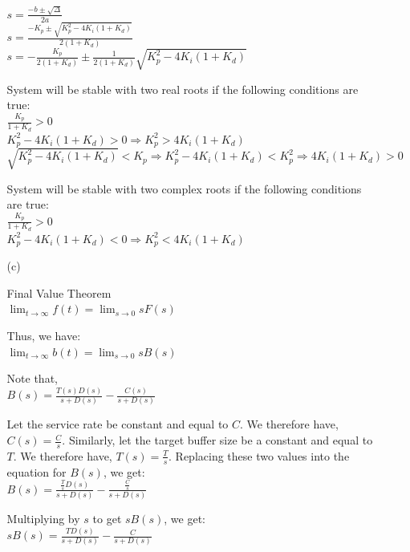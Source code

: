 \documentclass{article}
\begin{document}
\begin{enumerate}
\begin{itemize}
\noindent $s = {\frac{-b \pm \sqrt{\Delta}}{2a}}$\\

\noindent $s = {\frac{-K_p \pm \sqrt{K_p^2 - 4K_i(1+K_d)}}{2(1+K_d)}}$\\

\noindent $s = -{\frac{K_p}{2(1+K_d)}} \pm {\frac{1}{2(1+K_d)}}
\sqrt{K_p^2 - 4K_i(1+K_d)}$ \bigbreak

\noindent System will be stable with two real roots if the
following conditions are true:\\
\noindent ${\frac{K_p}{1+K_d}} > 0$\\
\noindent $K_p^2 - 4K_i(1+K_d) > 0 \Rightarrow K_p^2 > 4K_i(1+K_d)$\\
\noindent $\sqrt{K_p^2 - 4K_i(1+K_d)} < K_p \Rightarrow K_p^2 -
4K_i(1+K_d) < K_p^2 \Rightarrow 4K_i(1+K_d) > 0$ \bigbreak

\noindent System will be stable with two complex roots if the
following conditions are true:\\
\noindent ${\frac{K_p}{1+K_d}} > 0$\\
\noindent $K_p^2 - 4K_i(1+K_d) < 0 \Rightarrow K_p^2 <
4K_i(1+K_d)$


\bigbreak \bigbreak

\item[(c)] \smallbreak

\noindent Final Value Theorem\\
\noindent $\lim_{t \to \infty} f(t) = \lim_{s \to 0} sF(s)$
\bigbreak

\noindent Thus, we have:\\
\noindent $\lim_{t \to \infty} b(t) = \lim_{s \to 0} sB(s)$
\bigbreak

\noindent Note that,\\
\noindent $B(s) = {\frac{T(s) D(s)}{s + D(s)}} - {\frac{C(s)}{s +
D(s)}}$ \bigbreak

\noindent Let the service rate be constant and equal to $C$. We
therefore have, $C(s) = {\frac{C}{s}}$. Similarly, let the target
buffer size be a constant and equal to $T$. We therefore have,
$T(s) = {\frac{T}{s}}$. Replacing these two values into the
equation for $B(s)$, we get:\\
\noindent $B(s) = {\frac{{\frac{T}{s}} D(s)}{s + D(s)}} -
{\frac{\frac{C}{s}}{s + D(s)}}$ \bigbreak

\noindent Multiplying by $s$ to get $sB(s)$, we get:\\
\noindent $sB(s) = {\frac{T D(s)}{s + D(s)}} - {\frac{C}{s +
D(s)}}$


\end{itemize}
\end{enumerate}
\end{document}
